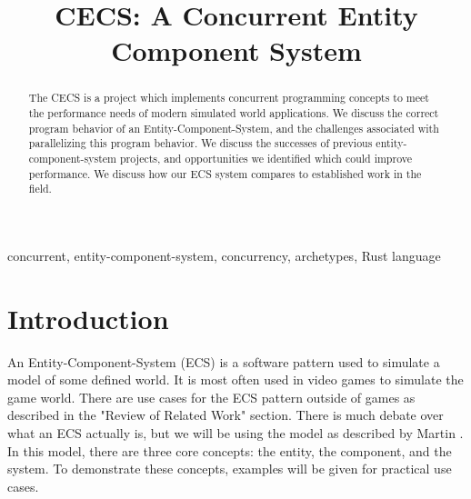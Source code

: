 \documentclass[conference]{IEEEtran}
\begin{document}
\title{CECS: A Concurrent Entity Component System}

\author{
\and
{}
}

\maketitle

\begin{abstract}
The CECS is a project which implements concurrent programming concepts to meet the performance needs of modern simulated world applications. We discuss the correct program behavior of an Entity-Component-System, and the challenges associated with parallelizing this program behavior. We discuss the successes of previous entity-component-system projects, and opportunities we identified which could improve performance. We discuss how our ECS system compares to established work in the field. 
\end{abstract}

\begin{IEEEkeywords}
concurrent, entity-component-system, concurrency, archetypes, Rust language
\end{IEEEkeywords}

\section{Introduction}
An Entity-Component-System (ECS) is a software pattern used to simulate a model of some defined world. It is most often used in video games to simulate the game world. There are use cases for the ECS pattern outside of games as described in the "Review of Related Work" section. There is much debate over what an ECS actually is, but we will be using the model as described by Martin \cite{martin_2007}. In this model, there are three core concepts: the entity, the component, and the system. To demonstrate these concepts, examples will be given for practical use cases.
\end{document}
